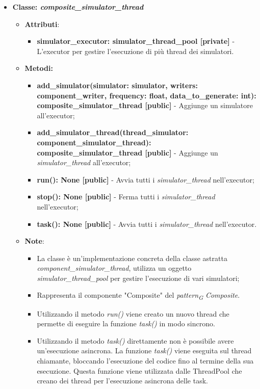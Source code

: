\begin{itemize}
    \item{\textbf{Classe: \textit{composite\_simulator\_thread}}}
    \begin{itemize}
        \item\textbf{Attributi}:
        \begin{itemize}
            \item \textbf{simulator\_executor: simulator\_thread\_pool [private]} - L'executor per gestire l'esecuzione di più thread dei simulatori.
        \end{itemize}
        \item \textbf{Metodi: }
        \begin{itemize}
            \item \textbf{add\_simulator(simulator: simulator, writers: component\_writer, frequency: float, data\_to\_generate: int): composite\_simulator\_thread [public]} - Aggiunge un simulatore all'executor;
            \item \textbf{add\_simulator\_thread(thread\_simulator: component\_simulator\_thread): composite\_simulator\_thread [public]} - Aggiunge un \textit{simulator\_thread} all'executor;
            \item \textbf{run(): None [public]} - Avvia tutti i \textit{simulator\_thread} nell'executor;
            \item \textbf{stop(): None [public]} - Ferma tutti i \textit{simulator\_thread} nell'executor;
            \item \textbf{task(): None [public]} - Avvia tutti i \textit{simulator\_thread} nell'executor.
        \end{itemize}
        \item\textbf{Note}:
        \begin{itemize}
            \item La classe è un'implementazione concreta della classe astratta \textit{component\_simulator\_thread}, utilizza un oggetto \textit{simulator\_thread\_pool} per gestire l'esecuzione di vari simulatori;
            \item Rappresenta il componente "Composite" del \textit{pattern}\textsubscript{\textit{G}} \textit{Composite}.
            \item Utilizzando il metodo \textit{run()} viene creato un nuovo thread che permette di eseguire la funzione \textit{task()} in modo sincrono.
            \item Utilizzando il metodo \textit{task()} direttamente non è possibile avere un'esecuzione asincrona. La funzione \textit{task()} viene eseguita sul thread chiamante, bloccando l'esecuzione del codice fino al termine della sua esecuzione. Questa funzione viene utilizzata dalle ThreadPool che creano dei thread per l'esecuzione asincrona delle task.
        \end{itemize}
    \end{itemize}


\end{itemize}
